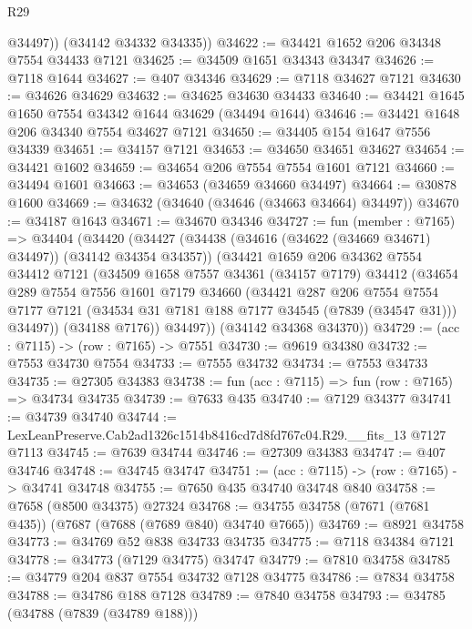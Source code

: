\begin{lexlean}{R29}
\begin{coremodule}
          @34497))
      (@34142 @34332 @34335))
@34622 := @34421 @1652 @206 @34348 @7554 @34433 @7121
@34625 := @34509 @1651 @34343 @34347
@34626 := @7118 @1644
@34627 := @407 @34346
@34629 := @7118 @34627 @7121
@34630 := @34626 @34629
@34632 := @34625 @34630 @34433
@34640 := @34421 @1645 @1650 @7554 @34342 @1644 @34629 (@34494 @1644)
@34646 := @34421 @1648 @206 @34340 @7554 @34627 @7121
@34650 := @34405 @154 @1647 @7556 @34339
@34651 := @34157 @7121
@34653 := @34650 @34651 @34627
@34654 := @34421 @1602
@34659 := @34654 @206 @7554 @7554 @1601 @7121
@34660 := @34494 @1601
@34663 := @34653 (@34659 @34660 @34497)
@34664 := @30878 @1600
@34669 := @34632 (@34640 (@34646 (@34663 @34664) @34497))
@34670 := @34187 @1643
@34671 := @34670 @34346
@34727 := fun (member : @7165) =>
  @34404
    (@34420
      (@34427
        (@34438 (@34616 (@34622 (@34669 @34671) @34497)) (@34142 @34354 @34357))
        (@34421
          @1659
          @206
          @34362
          @7554
          @34412
          @7121
          (@34509
            @1658
            @7557
            @34361
            (@34157 @7179)
            @34412
            (@34654
              @289
              @7554
              @7556
              @1601
              @7179
              @34660
              (@34421
                @287
                @206
                @7554
                @7554
                @7177
                @7121
                (@34534 @31 @7181 @188 @7177 @34545 (@7839 (@34547 @31)))
                @34497))
            (@34188 @7176))
          @34497))
      (@34142 @34368 @34370))
@34729 := (acc : @7115) -> (row : @7165) -> @7551
@34730 := @9619 @34380
@34732 := @7553 @34730 @7554
@34733 := @7555 @34732
@34734 := @7553 @34733
@34735 := @27305 @34383
@34738 := fun (acc : @7115) => fun (row : @7165) => @34734 @34735
@34739 := @7633 @435
@34740 := @7129 @34377
@34741 := @34739 @34740
@34744 := LexLeanPreserve.Cab2ad1326c1514b8416cd7d8fd767c04.R29.__fits_13 @7127 @7113
@34745 := @7639 @34744
@34746 := @27309 @34383
@34747 := @407 @34746
@34748 := @34745 @34747
@34751 := (acc : @7115) -> (row : @7165) -> @34741 @34748
@34755 := @7650 @435 @34740 @34748 @840
@34758 := @7658 (@8500 @34375) @27324
@34768 := @34755 @34758 (@7671 (@7681 @435)) (@7687 (@7688 (@7689 @840) @34740 @7665))
@34769 := @8921 @34758
@34773 := @34769 @52 @838 @34733 @34735
@34775 := @7118 @34384 @7121
@34778 := @34773 (@7129 @34775) @34747
@34779 := @7810 @34758
@34785 := @34779 @204 @837 @7554 @34732 @7128 @34775
@34786 := @7834 @34758
@34788 := @34786 @188 @7128
@34789 := @7840 @34758
@34793 := @34785 (@34788 (@7839 (@34789 @188)))

\end{coremodule}
\end{lexlean}
